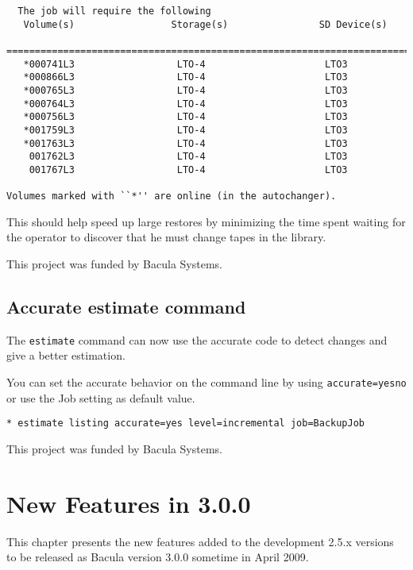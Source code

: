 \begin{verbatim}
  The job will require the following
   Volume(s)                 Storage(s)                SD Device(s)
   ===========================================================================
   *000741L3                  LTO-4                     LTO3 
   *000866L3                  LTO-4                     LTO3 
   *000765L3                  LTO-4                     LTO3 
   *000764L3                  LTO-4                     LTO3 
   *000756L3                  LTO-4                     LTO3 
   *001759L3                  LTO-4                     LTO3 
   *001763L3                  LTO-4                     LTO3 
    001762L3                  LTO-4                     LTO3 
    001767L3                  LTO-4                     LTO3 

Volumes marked with ``*'' are online (in the autochanger).
\end{verbatim}

This should help speed up large restores by minimizing the time spent
waiting for the operator to discover that he must change tapes in the library.

This project was funded by Bacula Systems.

\subsection{Accurate estimate command}

The \texttt{estimate} command can now use the accurate code to detect changes
and give a better estimation.

You can set the accurate behavior on the command line by using
\texttt{accurate=yes\vb{}no} or use the Job setting as default value.

\begin{verbatim}
* estimate listing accurate=yes level=incremental job=BackupJob
\end{verbatim}

This project was funded by Bacula Systems.

\section{New Features in 3.0.0}
\label{NewFeaturesChapter}

This chapter presents the new features added to the development 2.5.x
versions to be released as Bacula version 3.0.0 sometime in April 2009.

